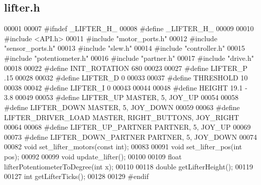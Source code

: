 \subsection{lifter.\+h}
\label{lifter_8h_source}

\begin{DoxyCode}
00001 
00007 \textcolor{preprocessor}{#ifndef \_LIFTER\_H\_}
00008 \textcolor{preprocessor}{#define \_LIFTER\_H\_}
00009 
00010 \textcolor{preprocessor}{#include <API.h>}
00011 \textcolor{preprocessor}{#include "motor_ports.h"}
00012 \textcolor{preprocessor}{#include "sensor_ports.h"}
00013 \textcolor{preprocessor}{#include "slew.h"}
00014 \textcolor{preprocessor}{#include "controller.h"}
00015 \textcolor{preprocessor}{#include "potentiometer.h"}
00016 \textcolor{preprocessor}{#include "partner.h"}
00017 \textcolor{preprocessor}{#include "drive.h"}
00018 
00022 \textcolor{preprocessor}{#define INIT\_ROTATION 680}
00023 
00027 \textcolor{preprocessor}{#define LIFTER\_P .15}
00028 
00032 \textcolor{preprocessor}{#define LIFTER\_D 0}
00033 
00037 \textcolor{preprocessor}{#define THRESHOLD 10}
00038 
00042 \textcolor{preprocessor}{#define LIFTER\_I 0}
00043 
00044 
00048 \textcolor{preprocessor}{#define HEIGHT 19.1 - 3.8}
00049 
00053 \textcolor{preprocessor}{#define LIFTER\_UP MASTER, 5, JOY\_UP}
00054 
00058 \textcolor{preprocessor}{#define LIFTER\_DOWN MASTER, 5, JOY\_DOWN}
00059 
00063 \textcolor{preprocessor}{#define LIFTER\_DRIVER\_LOAD MASTER, RIGHT\_BUTTONS, JOY\_RIGHT}
00064 
00068 \textcolor{preprocessor}{#define LIFTER\_UP\_PARTNER PARTNER, 5, JOY\_UP}
00069 
00073 \textcolor{preprocessor}{#define LIFTER\_DOWN\_PARTNER PARTNER, 5, JOY\_DOWN}
00074 
00082 \textcolor{keywordtype}{void} set_lifter_motors(\textcolor{keyword}{const} \textcolor{keywordtype}{int});
00083 
00091 \textcolor{keywordtype}{void} set_lifter_pos(\textcolor{keywordtype}{int} pos);
00092 
00099 \textcolor{keywordtype}{void} update_lifter();
00100 
00109 \textcolor{keywordtype}{float} lifterPotentiometerToDegree(\textcolor{keywordtype}{int} x);
00110 
00118 \textcolor{keywordtype}{double} getLifterHeight();
00119 
00127 \textcolor{keywordtype}{int} getLifterTicks();
00128 
00129 \textcolor{preprocessor}{#endif}
\end{DoxyCode}
